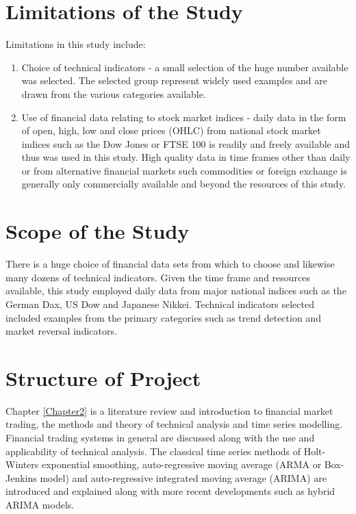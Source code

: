 \section{Limitations of the Study}
Limitations in this study include:
\begin{enumerate}
\item Choice of technical indicators - a small selection of the huge number available was selected. The selected group represent widely used examples and are drawn from the various categories available.
\item Use of financial data relating to stock market indices - daily data in the form of open, high, low and close prices (OHLC) from national stock market indices such as the Dow Jones or FTSE 100 is readily and freely available and thus was used in this study. High quality data in time frames other than daily or from alternative financial markets such commodities or foreign exchange is generally only commercially available and beyond the resources of this study.
\end{enumerate}

\section{Scope of the Study }
There is a huge choice of financial data sets from which to choose and likewise many dozens of technical indicators. Given the time frame and resources available, this study employed daily data from major national indices such as the German Dax, US Dow and Japanese Nikkei. Technical indicators selected included examples from the primary categories such as trend detection and market reversal indicators.

\section{Structure of Project}
Chapter \ref{Chapter2} is a literature review and introduction to financial market trading, the methods and theory of technical analysis and time series modelling. Financial trading systems in general are discussed along with the use and applicability of technical analysis. The classical time series methods of Holt-Winters exponential smoothing, auto-regressive moving average (ARMA or Box-Jenkins model) and auto-regressive integrated moving average (ARIMA) are introduced and explained along with more recent developments such as hybrid ARIMA models.

